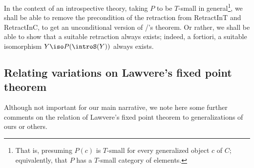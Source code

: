 In the context of an introspective theory, taking $P$ to be $T$-small in general\footnote{That is, presuming $P(c)$ is $T$-small for every generalized object $c$ of $C$; equivalently, that $P$ has a $T$-small category of elements.}, we shall be able to remove the precondition of the retraction from RetractInT and RetractInC, to get an unconditional version of \Loeb/'s theorem. Or rather, we shall be able to show that a suitable retraction always exists; indeed, a fortiori, a suitable isomorphism $Y \iso P(\introS(Y))$ always exists.

\subsection{Relating variations on Lawvere's fixed point theorem}
Although not important for our main narrative, we note here some further comments on the relation of Lawvere's fixed point theorem to generalizations of ours or others.

